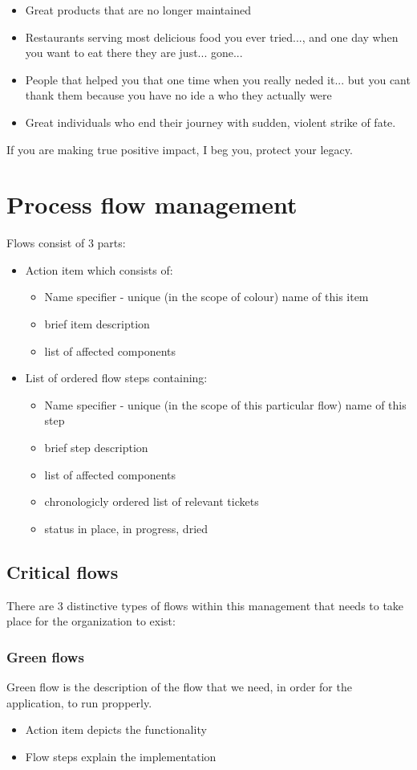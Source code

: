 \begin{enumerate}
\begin{itemize}
    \item Great products that are no longer maintained
    \item Restaurants serving most delicious food you ever tried..., and one day when you want to eat there they are just... gone...
    \item People that helped you that one time when you really neded it... but you cant thank them because you have no ide a who they actually were 
    \item Great individuals who end their journey with sudden, violent strike of fate.
  \end{itemize} 
  If you are making true positive impact, I beg you, protect your legacy.
\end{enumerate} 
\newpage
\section{Process flow management}
Flows consist of 3 parts:
\begin{itemize}
  \item Action item which consists of:
  \begin{itemize}
    \item Name specifier - unique (in the scope of colour) name of this item
    \item brief item description
    \item list of affected components
  \end{itemize}
  \item List of ordered flow steps containing:
  \begin{itemize}
    \item Name specifier - unique (in the scope of this particular flow) name of this step
    \item brief step description
    \item list of affected components
    \item chronologicly ordered list of relevant tickets
    \item status {in place, in progress, dried}
  \end{itemize}
\end{itemize}
\subsection{Critical flows}
There are 3 distinctive types of flows within this management that needs to take place for the organization to exist:
\subsubsection{Green flows}\label{philo:green:flow}
Green flow is the description of the flow that we need, in order for the application, to run propperly. 
\begin{itemize}
  \item Action item depicts the functionality 
  \item Flow steps explain the implementation
\end{itemize}
